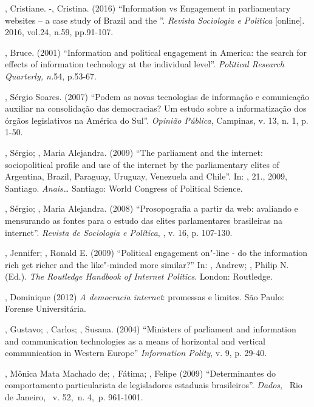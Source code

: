 \begin{Parskip}
, Cristiane. -, Cristina. (2016) ``Information vs
Engagement in parliamentary websites -- a case study of Brazil and the
''. \emph{Revista Sociologia e Politica} {[}online{]}. 2016, vol.24,
n.59, pp.91-107.

, Bruce. (2001) ``Information and political engagement in America:
the search for effects of information technology at the individual
level''. \emph{Political Research Quarterly, n.}54, p.53-67.

, Sérgio Soares. (2007) ``Podem as novas tecnologias de informação
e comunicação auxiliar na consolidação das democracias? Um estudo sobre
a informatização dos órgãos legislativos na América do Sul''.
\emph{Opinião Pública}, Campinas, v. 13, n. 1, p. 1-50.

, Sérgio; , Maria Alejandra. (2009) ``The parliament and the
internet: sociopolitical profile and use of the internet by the
parliamentary elites of Argentina, Brazil, Paraguay, Uruguay, Venezuela
and Chile''. In: , 21., 2009,
Santiago. \emph{Anais\ldots{}} Santiago:  World Congress of Political
Science.

, Sérgio; , Maria Alejandra. (2008) ``Prosopografia a partir
da web: avaliando e mensurando as fontes para o estudo das elites
parlamentares brasileiras na internet''. \emph{Revista de Sociologia e
Política}, , v. 16, p. 107-130.

, Jennifer; , Ronald E. (2009) ``Political engagement
on"-line - do the information rich get richer and the like"-minded more
similar?'' In: , Andrew; , Philip N. (Ed.). \emph{The
Routledge Handbook of Internet Politics}. London: Routledge.

, Dominique (2012) \emph{A democracia internet}: promessas e
limites. São Paulo: Forense Universitária.

, Gustavo; , Carlos; , Susana. (2004) ``Ministers
of parliament and information and communication technologies as a means
of horizontal and vertical communication in Western Europe''
\emph{Information Polity}, v. 9, p. 29-40.

, Mônica Mata Machado de; , Fátima; , Felipe (2009)
``Determinantes do comportamento particularista de legisladores
estaduais brasileiros''. \emph{Dados},~ Rio de Janeiro,~ v. 52,~n. 4,~p.
961-1001.


\end{Parskip}
